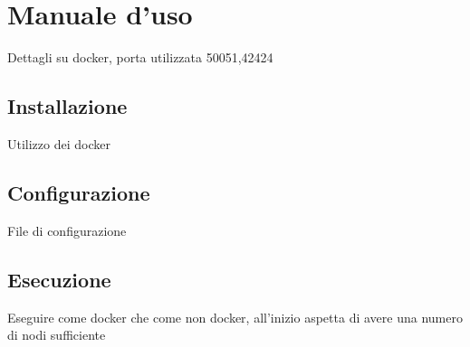 \documentclass[conference]{IEEEtran}
\begin{document}
\section{Manuale d'uso}
Dettagli su docker, porta utilizzata 50051,42424
\subsection{Installazione}
Utilizzo dei docker
\subsection{Configurazione}
File di configurazione
\subsection{Esecuzione}
Eseguire come docker che come non docker, all'inizio aspetta di avere una numero di nodi sufficiente


\printbibliography
\end{document}
